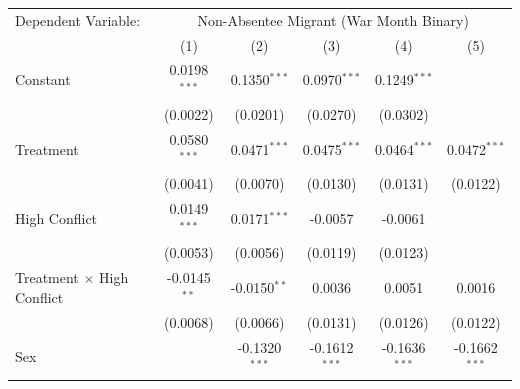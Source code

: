 \begingroup
\centering
\renewcommand{\arraystretch}{0.75}   %
\setlength{\aboverulesep}{0pt}       %
\setlength{\belowrulesep}{0pt}
\begin{tabular}{lccccc}
   \tabularnewline \midrule \midrule
   Dependent Variable: & \multicolumn{5}{c}{Non-Absentee Migrant (War Month Binary)}\\
                                                     
                                               & (1)            & (2)                            & (3)                     & (4)                     & (5)\\  
   \midrule
   
   Constant                                          & 0.0198$^{***}$ & 0.1350$^{***}$                 & 0.0970$^{***}$          & 0.1249$^{***}$          &   \\   
                                                     & (0.0022)       & (0.0201)                       & (0.0270)                & (0.0302)                &   \\   
   Treatment                                         & 0.0580$^{***}$ & 0.0471$^{***}$                 & 0.0475$^{***}$          & 0.0464$^{***}$          & 0.0472$^{***}$\\   
                                                     & (0.0041)       & (0.0070)                       & (0.0130)                & (0.0131)                & (0.0122)\\   
  High Conflict                        & 0.0149$^{***}$ & 0.0171$^{***}$                 & -0.0057                 & -0.0061                 &   \\   
                                                     & (0.0053)       & (0.0056)                       & (0.0119)                & (0.0123)                &   \\   
   Treatment $\times$ High Conflict     & -0.0145$^{**}$ & -0.0150$^{**}$                 & 0.0036                  & 0.0051                  & 0.0016\\   
                                                     & (0.0068)       & (0.0066)                       & (0.0131)                & (0.0126)                & (0.0122)\\   
   Sex                                               &                & -0.1320$^{***}$                & -0.1612$^{***}$         & -0.1636$^{***}$         & -0.1662$^{***}$\\   

\end{tabular}
